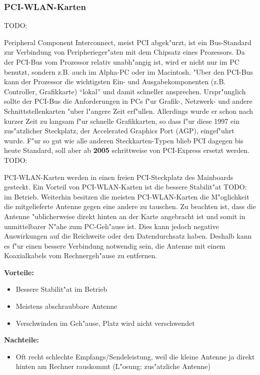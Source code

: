 \subsubsection{PCI-WLAN-Karten}

TODO: 

Peripheral Component Interconnect, meist PCI abgek"urzt, ist ein
Bus-Standard zur Verbindung von Peripherieger"aten mit dem Chipsatz
eines Prozessors. Da der PCI-Bus vom Prozessor relativ unabh"angig ist,
wird er nicht nur im PC benutzt, sondern z.B. auch im Alpha-PC oder
im Macintosh. "Uber den PCI-Bus kann der Prozessor die wichtigsten Ein-
und Ausgabekomponenten (z.B. Controller, Grafikkarte) "`lokal"' und damit
schneller ansprechen. Urspr"unglich sollte der PCI-Bus die Anforderungen in
PCs f"ur Grafik-, Netzwerk- und andere Schnittstellenkarten "uber l"angere
Zeit erf"ullen. Allerdings wurde er schon nach kurzer Zeit zu langsam f"ur
schnelle Grafikkarten, so dass f"ur diese 1997 ein zus"atzlicher Steckplatz,
der Accelerated Graphics Port (AGP), eingef"uhrt wurde. F"ur so gut wie
alle anderen Steckkarten-Typen blieb PCI dagegen bis heute Standard, soll
aber ab \textbf{2005} schrittweise von PCI-Express ersetzt werden.
TODO: 

PCI-WLAN-Karten werden in einen freien PCI-Steckplatz des Mainboards
gesteckt.
Ein Vorteil von PCI-WLAN-Karten ist die bessere Stabilit"at 
TODO: im
Betrieb. Weiterhin besitzen die meisten PCI-WLAN-Karten die M"oglichkeit
die mitgelieferte Antenne gegen eine andere zu tauschen. Zu beachten ist,
dass die Antenne "ublicherweise direkt hinten an der Karte angebracht
ist und somit in unmittelbarer N"ahe zum PC-Geh"ause ist. Dies kann
jedoch negative Auswirkungen auf die Reichweite oder den Datendurchsatz
haben. Deshalb kann es f"ur einen bessere Verbindung notwendig sein,
die Antenne mit einem Koaxialkabels vom Rechnergeh"ause zu entfernen.

\textbf{Vorteile:}

\begin{itemize}
	\item Bessere Stabilit"at im Betrieb
	\item Meistens abschraubbare Antenne
	\item Verschwinden im Geh"ause, Platz wird nicht verschwendet 
\end{itemize}

\textbf{Nachteile:}

\begin{itemize}
	\item Oft recht schlechte Empfangs/Sendeleistung, weil die kleine Antenne
				ja direkt hinten am Rechner rauskommt (L"osung: zus"atzliche Antenne)
\end{itemize}

